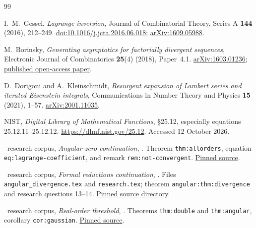 \begin{thebibliography}{99}

I.~M.~Gessel, \emph{Lagrange inversion},
Journal of Combinatorial Theory, Series A \textbf{144} (2016), 212--249.
\href{https://doi.org/10.1016/j.jcta.2016.06.018}{doi:10.1016/j.jcta.2016.06.018};
\href{https://arxiv.org/abs/1609.05988}{arXiv:1609.05988}.

M.~Borinsky, \emph{Generating asymptotics for factorially divergent
sequences}, Electronic Journal of Combinatorics \textbf{25}(4)
(2018), Paper~4.1.
\href{https://arxiv.org/abs/1603.01236}{arXiv:1603.01236};
\href{https://www.combinatorics.org/ojs/index.php/eljc/article/download/v25i4p1/pdf/}{published open-access paper}.

D.~Dorigoni and A.~Kleinschmidt,
\emph{Resurgent expansion of Lambert series and iterated Eisenstein
integrals}, Communications in Number Theory and Physics \textbf{15}
(2021), 1--57.
\href{https://arxiv.org/abs/2001.11035}{arXiv:2001.11035}.

NIST, \emph{Digital Library of Mathematical Functions},
\S25.12, especially equations 25.12.11--25.12.12.
\url{https://dlmf.nist.gov/25.12}. Accessed 12 October 2026.

\repo\ research corpus, \emph{Angular-zero continuation},
.
Theorem \texttt{thm:allorders}, equation
\texttt{eq:lagrange-coefficient}, and remark
\texttt{rem:not-convergent}.
\href{https://github.com/VladimirReshetnikov/ProveIt/blob/8f5afd4d7565df808359f6a0c22f87f79a119bb9/Analysis/Polylogarithms/docs/reports/angular-zero-continuation/article.tex}{Pinned source}.

\repo\ research corpus, \emph{Formal reductions continuation},
.
Files \texttt{angular\_divergence.tex} and \texttt{research.tex};
theorem \texttt{angular:thm:divergence} and research questions 13--14.
\href{https://github.com/VladimirReshetnikov/ProveIt/tree/8f5afd4d7565df808359f6a0c22f87f79a119bb9/Analysis/Polylogarithms/docs/reports/formal-reductions-continuation/article/sections}{Pinned source directory}.

\repo\ research corpus, \emph{Real-order threshold},
.
Theorems \texttt{thm:double} and \texttt{thm:angular},
corollary \texttt{cor:gaussian}.
\href{https://github.com/VladimirReshetnikov/ProveIt/blob/8f5afd4d7565df808359f6a0c22f87f79a119bb9/Analysis/Polylogarithms/docs/reports/real-order-threshold/article/real_order_threshold.tex}{Pinned source}.


\end{thebibliography}
